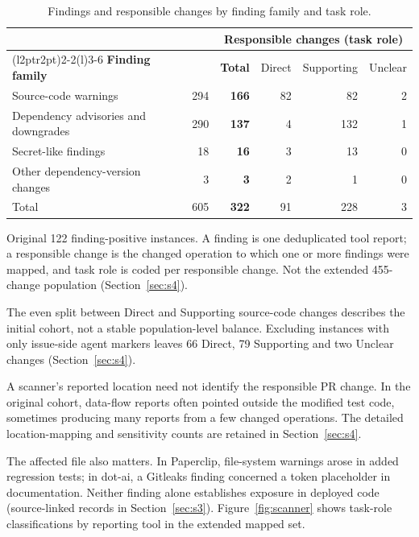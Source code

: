 \documentclass[acmsmall,screen,nonacm]{acmart}
\begin{document}
\begin{table}[!tbp]
\caption{Findings and responsible changes by finding family and task role.}
\label{tab:role}
\small
\begin{tabular}{@{}l>{\columncolor{unitshade}}r@{\hspace{10pt}}rrrr@{}}
\toprule
& \multicolumn{1}{>{\columncolor{unitshade}}c}{\textbf{Findings}} & \multicolumn{4}{c}{\textbf{Responsible changes (task role)}}\\
\cmidrule(l{2pt}r{2pt}){2-2}\cmidrule(l){3-6}
\textbf{Finding family} & \multicolumn{1}{>{\columncolor{unitshade}}r}{Reported} & \textbf{Total} & Direct & Supporting & Unclear\\
\midrule
Source-code warnings & 294 & \textbf{166} & 82 & 82 & 2\\
Dependency advisories and downgrades & 290 & \textbf{137} & 4 & 132 & 1\\
Secret-like findings & 18 & \textbf{16} & 3 & 13 & 0\\
Other dependency-version changes & 3 & \textbf{3} & 2 & 1 & 0\\
\midrule
Total & 605 & \textbf{322} & 91 & 228 & 3\\
\bottomrule
\end{tabular}
\par\smallskip\raggedright\footnotesize Original 122 finding-positive instances. A finding is one deduplicated tool report; a responsible change is the changed operation to which one or more findings were mapped, and task role is coded per responsible change. Not the extended 455-change population (Section~\ref{sec:s4}).
\end{table}

The even split between Direct and Supporting source-code changes describes the initial cohort, not a stable population-level balance. Excluding instances with only issue-side agent markers leaves 66 Direct, 79 Supporting and two Unclear changes (Section~\ref{sec:s4}).

A scanner's reported location need not identify the responsible PR change. In the original cohort, data-flow reports often pointed outside the modified test code, sometimes producing many reports from a few changed operations. The detailed location-mapping and sensitivity counts are retained in Section~\ref{sec:s4}.

The affected file also matters. In Paperclip, file-system warnings arose in added regression tests; in dot-ai, a Gitleaks finding concerned a token placeholder in documentation. Neither finding alone establishes exposure in deployed code (source-linked records in Section~\ref{sec:s3}). Figure~\ref{fig:scanner} shows task-role classifications by reporting tool in the extended mapped set.
\end{document}
